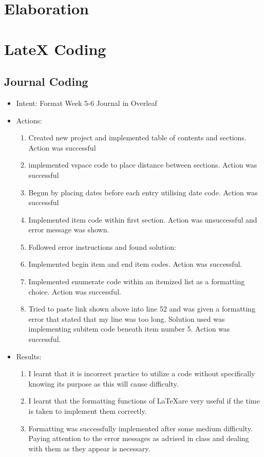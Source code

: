 \documentclass{article}
\begin{document}
\vspace{5mm}
\section{Elaboration}

\vspace{5mm}

\section{LateX Coding}
\subsection{Journal Coding}
\date{27/8/2019 12:52}
\begin{itemize}
\item{Intent: Format Week 5-6 Journal in Overleaf}
\item{Actions:}
\begin{enumerate}
    \item{Created new project and implemented table of contents and sections. Action was successful}
    \item{implemented vspace code to place distance between sections. Action was successful}
    \item{Begun by placing dates before each entry utilising date code. Action was successful}
    \item{Implemented item code within first section. Action was unsuccessful and error message was shown.}
    \item{Followed error instructions and found solution:}
    \item{Implemented begin item and end item codes. Action was successful.}
    \item{Implemented enumerate code within an itemized list as a formatting choice. Action was successful.}
    \item{Tried to paste link shown above into line 52 and was given a formatting error that stated that my line was too long. Solution used was implementing subitem code beneath item number 5. Action was successful.}
    \end{enumerate}
\item{Results:}
\begin{enumerate}
    \item{I learnt that it is incorrect practice to utilize a code without specifically knowing its purpose as this will cause difficulty.}
    \item{I learnt that the formatting functions of \LaTeX are very useful if the time is taken to implement them correctly.}
    \item{Formatting was successfully implemented after some medium difficulty. Paying attention to the error messages as advised in class and dealing with them as they appear is necessary.}
\end{enumerate}
\end{itemize}
\end{document}
